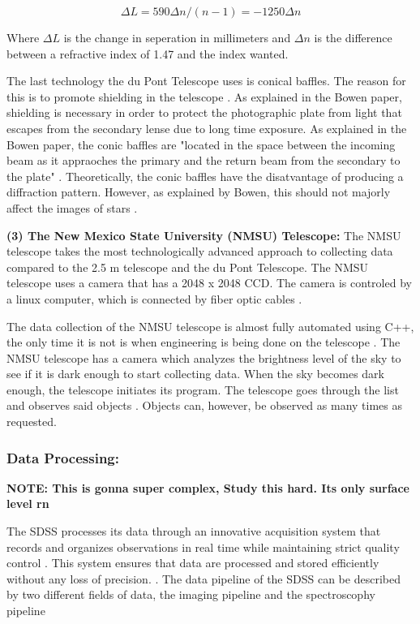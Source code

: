 \documentclass[preprint,linenumbers, longauthor]{aastex631}
\begin{document}
\begin{equation}
\Delta L = 590\Delta n / (n - 1) = -1250\Delta n
\end{equation}

Where $\Delta L$ is the change in seperation in millimeters and $\Delta n$ is the difference between a refractive index of 1.47 and the index wanted.

The last technology the du Pont Telescope uses is conical baffles. The reason for this is to promote shielding in the telescope \cite{bowenOpticalDesign40in1973}.
As explained in the Bowen paper, shielding is necessary in order to protect the photographic plate from light that escapes from the secondary lense due to long time exposure.
As explained in the Bowen paper, the conic baffles are "located in the space between the incoming beam as it appraoches the primary and the return beam from the secondary to the plate" \cite{bowenOpticalDesign40in1973}.
Theoretically, the conic baffles have the disatvantage of producing a diffraction pattern. However, as explained by Bowen, this should not majorly affect the images of stars \cite{bowenOpticalDesign40in1973}. 

\textbf{(3) The New Mexico State University (NMSU) Telescope:}  
The NMSU telescope takes the most technologically advanced approach to collecting data compared to the 2.5 m telescope and the du Pont Telescope.
The NMSU telescope uses a camera that has a 2048 x 2048 CCD. The camera is controled by a linux computer, which is connected by fiber optic cables \cite{holtzmanNMSU1Telescope2010}.

The data collection of the NMSU telescope is almost fully automated using C++, the only time it is not is when engineering is being done on the telescope \cite{holtzmanNMSU1Telescope2010}.
The NMSU telescope has a camera which analyzes the brightness level of the sky to see if it is dark enough to start collecting data.
When the sky becomes dark enough, the telescope initiates its program. The telescope goes through the list and observes said objects \cite{holtzmanNMSU1Telescope2010}.
Objects can, however, be observed as many times as requested. 

\subsubsection{Data Processing:} 
 \textbf{NOTE: This is gonna super complex, Study this hard. Its only surface level rn } 

The SDSS processes its data through an innovative acquisition system that records and organizes observations in real time while maintaining strict quality control \cite{gunn25TelescopeSloan2006}. 
This system ensures that data are processed and stored efficiently without any loss of precision. \cite{gunn25TelescopeSloan2006}. 
The data pipeline of the SDSS can be described by two different fields of data, the imaging pipeline and the spectroscophy pipeline
\end{document}
